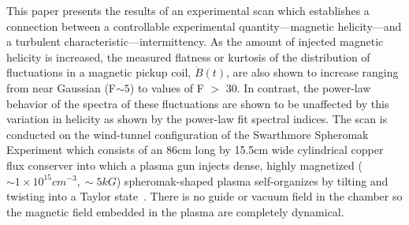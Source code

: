 \documentclass[aip,prl,amsmath,amssymb,reprint,superscriptaddress]{revtex4-1} %
\begin{document}

This paper presents the results of an experimental scan which establishes a connection between a controllable experimental quantity---magnetic helicity---and a turbulent characteristic---intermittency. As the amount of injected magnetic helicity is increased, the measured flatness or kurtosis of the distribution of fluctuations in a magnetic pickup coil, $\dot{B}(t)$, are also shown to increase ranging from near Gaussian (F$\sim 5$) to values of F $>$ 30. In contrast, the power-law behavior of the spectra of these fluctuations are shown to be unaffected by this variation in helicity as shown by the power-law fit spectral indices. The scan is conducted on the wind-tunnel configuration of the Swarthmore Spheromak Experiment which consists of an 86cm long by 15.5cm wide cylindrical copper flux conserver into which a plasma gun injects dense, highly magnetized ($\sim 1\times 10^{15} cm^{-3}, \sim 5kG$) spheromak-shaped plasma self-organizes by tilting and twisting into a Taylor state~\cite{Gray13,Matteaus80,Taylor86}. There is no guide or vacuum field in the chamber so the magnetic field embedded in the plasma are completely dynamical. 

\end{document}
